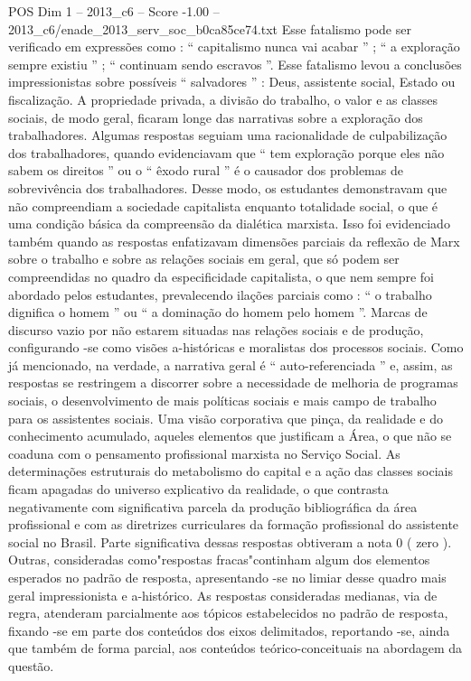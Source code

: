 \begin{textsample}{POS Dim 1 – 2013\_c6 – Score -1.00 – 2013\_c6/enade\_2013\_serv\_soc\_b0ca85ce74.txt}
Esse fatalismo pode ser verificado em expressões como : “ capitalismo nunca vai acabar ” ; “ a exploração sempre existiu ” ; “ continuam sendo escravos ”.
Esse fatalismo levou a conclusões impressionistas sobre possíveis “ salvadores ” : Deus, assistente social, Estado ou fiscalização.
A propriedade privada, a divisão do trabalho, o valor e as classes sociais, de modo geral, ficaram longe das narrativas sobre a exploração dos trabalhadores.
Algumas respostas seguiam uma racionalidade de culpabilização dos trabalhadores, quando evidenciavam que “ tem exploração porque eles não sabem os direitos ” ou o “ êxodo rural ” é o causador dos problemas de sobrevivência dos trabalhadores.
Desse modo, os estudantes demonstravam que não compreendiam a sociedade capitalista enquanto totalidade social, o que é uma condição básica da compreensão da dialética marxista.
Isso foi evidenciado também quando as respostas enfatizavam dimensões parciais da reflexão de Marx sobre o trabalho e sobre as relações sociais em geral, que só podem ser compreendidas no quadro da especificidade capitalista, o que nem sempre foi abordado pelos estudantes, prevalecendo ilações parciais como : “ o trabalho dignifica o homem ” ou “ a dominação do homem pelo homem ”.
Marcas de discurso vazio por não estarem situadas nas relações sociais e de produção, configurando -se como visões a-históricas e moralistas dos processos sociais.
Como já mencionado, na verdade, a narrativa geral é “ auto-referenciada ” e, assim, as respostas se restringem a discorrer sobre a necessidade de melhoria de programas sociais, o desenvolvimento de mais políticas sociais e mais campo de trabalho para os assistentes sociais.
Uma visão corporativa que pinça, da realidade e do conhecimento acumulado, aqueles elementos que justificam a Área, o que não se coaduna com o pensamento profissional marxista no Serviço Social.
As determinações estruturais do metabolismo do capital e a ação das classes sociais ficam apagadas do universo explicativo da realidade, o que contrasta negativamente com significativa parcela da produção bibliográfica da área profissional e com as diretrizes curriculares da formação profissional do assistente social no Brasil.
Parte significativa dessas respostas obtiveram a nota 0 ( zero ).
Outras, consideradas como"respostas fracas"continham algum dos elementos esperados no padrão de resposta, apresentando -se no limiar desse quadro mais geral impressionista e a-histórico.
As respostas consideradas medianas, via de regra, atenderam parcialmente aos tópicos estabelecidos no padrão de resposta, fixando -se em parte dos conteúdos dos eixos delimitados, reportando -se, ainda que também de forma parcial, aos conteúdos teórico-conceituais na abordagem da questão.

\end{textsample}
